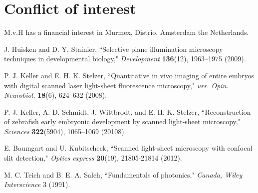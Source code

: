 \documentclass[12pt]{spieman}  %
\begin{document}
\section*{Conflict of interest}
M.v.H has a financial interest in Murmex, Distrio, Amsterdam the Netherlands.



\begin{thebibliography}{0}

 J. Huisken and D. Y. Stainier, ``Selective plane illumination microscopy techniques in developmental biology," \emph{Development} \textbf{136}(12), 1963–1975 (2009).

 P. J. Keller and E. H. K. Stelzer, ``Quantitative in vivo imaging of entire embryos with digital scanned laser light-sheet fluorescence microscopy," \emph{urr. Opin. Neurobiol.} \textbf{18}(6), 624–632 (2008).

 P. J. Keller, A. D. Schmidt, J. Wittbrodt, and E. H. K. Stelzer, ``Reconstruction of zebrafish early embryonic development by scanned light-sheet microscopy," \emph{Sciences} \textbf{322}(5904), 1065–1069 (20108).

 E. Baumgart and U. Kubitscheck, ``Scanned light-sheet microscopy with confocal slit detection," \emph{Optics express} \textbf{20}(19), 21805-21814 (2012).

%
%

 M. C. Teich and B. E. A. Saleh, ``Fundamentals of photonics," \emph{Canada, Wiley Interscience} 3 (1991).


\end{thebibliography}
\end{document}
